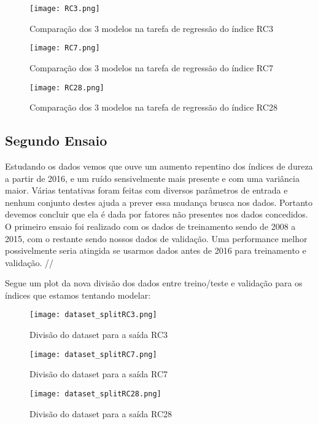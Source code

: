 \begin{figure}[H]
\centering
\texttt{[image: RC3.png]}
\caption{Comparação dos 3 modelos na tarefa de regressão do índice RC3}
\end{figure}

\begin{figure}[H]
\centering
\texttt{[image: RC7.png]}
\caption{Comparação dos 3 modelos na tarefa de regressão do índice RC7}
\end{figure}

\begin{figure}[H]
\centering
\texttt{[image: RC28.png]}
\caption{Comparação dos 3 modelos na tarefa de regressão do índice RC28}
\end{figure}


\subsection{Segundo Ensaio}

Estudando os dados vemos que ouve um aumento repentino dos índices de dureza a partir de 2016, e um ruído sensivelmente mais presente e com uma variância maior. Várias tentativas foram feitas com diversos parâmetros de entrada e nenhum conjunto destes ajuda a prever essa mudança brusca nos dados. Portanto devemos concluir que ela é dada por fatores não presentes nos dados concedidos. O primeiro ensaio foi realizado com os dados de treinamento sendo de 2008 a 2015, com o restante sendo nossos dados de validação. Uma performance melhor possivelmente seria atingida se usarmos dados antes de 2016 para treinamento e validação. //


Segue um plot da nova divisão dos dados entre treino/teste e validação para os índices que estamos tentando modelar:

\begin{figure}[H]
\texttt{[image: dataset\_splitRC3.png]}
\caption{Divisão do dataset para a saída RC3}
\end{figure}

\begin{figure}[H]
\texttt{[image: dataset\_splitRC7.png]}
\caption{Divisão do dataset para a saída RC7}
\end{figure}

\begin{figure}[H]
\texttt{[image: dataset\_splitRC28.png]}
\caption{Divisão do dataset para a saída RC28}
\end{figure}


